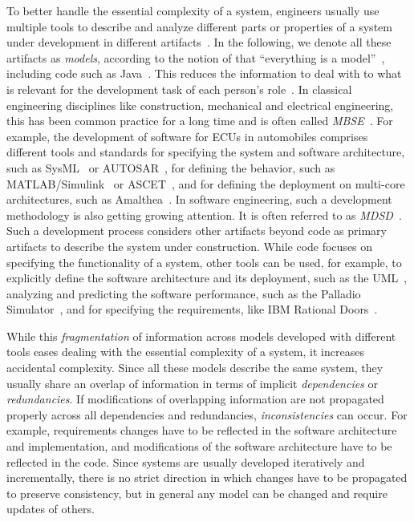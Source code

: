 To better handle the essential complexity of a system, engineers usually use multiple tools to describe and analyze different parts or properties of a system under development in different artifacts~\cite{franzago2018mdseChallenges-TSE}.
In the following, we denote all these artifacts as \emph{models}, according to the notion of \citeauthor{bezivin2005sosym} that \enquote{everything is a model}~\cite{bezivin2005sosym}, including code such as Java~\cite{heidenreich2010jamopp-SLE}.
This reduces the information to deal with to what is relevant for the development task of each person's role~\cite{stevens2018bidirectionality-ECMFA}.
In classical engineering disciplines like construction, mechanical and electrical engineering, this has been common practice for a long time and is often called \emph{\gls{MBSE}}~\cite{estefan2007MbseSurvey}.
For example, the development of software for \glspl{ECU} in automobiles comprises different tools and standards for specifying the system and software architecture, such as SysML~\cite{sysml} or AUTOSAR~\cite{scheid2015autosar}, for defining the behavior, such as MATLAB/Simulink~\cite{simulink} or ASCET~\cite{ascet}, and for defining the deployment on multi-core architectures, such as Amalthea~\cite{amalthea, wolff2014a}.
In software engineering, such a development methodology is also getting growing attention.
It is often referred to as \emph{\gls{MDSD}}~\cite{stahl2006a}.
Such a development process considers other artifacts beyond code as primary artifacts to describe the system under construction.
While code focuses on specifying the functionality of a system, other tools can be used, for example, to explicitly define the software architecture and its deployment, such as the \gls{UML}~\cite{uml}, analyzing and predicting the software performance, such as the Palladio Simulator~\cite{reussner2016a}, and for specifying the requirements, like IBM Rational Doors~\cite{laplante2012RequirementsEngineering-Book}.

While this \emph{fragmentation} of information across models developed with different tools eases dealing with the essential complexity of a system, it increases accidental complexity.
Since all these models describe the same system, they usually share an overlap of information in terms of implicit \emph{dependencies} or \emph{redundancies}.
If modifications of overlapping information are not propagated properly across all dependencies and redundancies, \emph{inconsistencies} can occur.
For example, requirements changes have to be reflected in the software architecture and implementation, and modifications of the software architecture have to be reflected in the code.
Since systems are usually developed iteratively and incrementally, there is no strict direction in which changes have to be propagated to preserve consistency, but in general any model can be changed and require updates of others.

